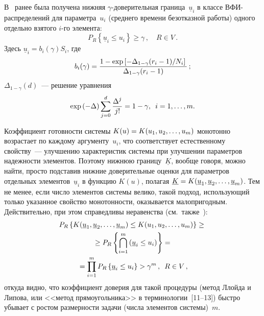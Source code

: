 \begin{multicols}{2}
     В~\cite{9-pav, 10-pav} ранее была получена нижняя 
     $\gamma$-до\-ве\-ри\-тель\-ная граница~$\underline{u}_i$ в классе 
ВФИ-рас\-пре\-де\-ле\-ний для параметра~$u_i$ (среднего времени 
безотказной работы) одного отдельно взятого $i$-го элемента:
     \begin{equation}
     P_R\left\{ \underline{u}_i\leq u_i\right\} \geq \gamma\,,\quad R\in V\,.
     \label{e2-pav}
     \end{equation}
Здесь $\underline{u}_i = b_i(\gamma)S_i$, где 
$$
b_i(\gamma)= \displaystyle\frac{\displaystyle  1-\exp \left[ -
\Delta_{1-\gamma}(r_i-1)/N_i\right]\mathstrut}{\displaystyle \Delta_{1-\gamma}(r_i-1)\mathstrut}\,;
$$ 
$\Delta_{1-\gamma}(d)$~--- решение уравнения 
$$
\exp \left( - \Delta\right)\sum\limits_{j=0}^d \fr{\Delta^j}{j!}=1-\gamma,\enskip 
i\hm=1,\ldots , m. $$

Коэффициент готовности системы $K(u)\hm= K(u_1, u_2,\ldots ,u_m)$ 
монотонно возрастает по каж\-до\-му аргументу~$u_i$, что соответствует 
естественному свойству~--- улучшению характеристик системы при 
улучшении параметров надежности элементов. Поэтому нижнюю 
границу~$\underline{K}$, вообще говоря, можно найти, просто подставив 
нижние доверительные оценки для параметров отдельных 
элементов~$\underline{u}_i$ в функцию $K(u)$, полагая $\underline{K}\hm= 
K(\underline{u}_1, \underline{u}_2,\ldots , \underline{u}_m)$. Тем не менее, 
если число элементов системы велико, такой подход, использующий только 
указанное свойство монотонности, оказывается малопригодным. 
Действительно, при этом справедливы неравенства (см.\ 
также~\cite{11-pav, 12-pav}):
\begin{multline*}
P_R\left\{ K(\underline{u}_1, \underline{u}_2, \ldots , \underline{u}_m) \leq 
K(u_1, u_2, \ldots , u_m)\right\} \geq{}\\
{}\geq P_R\left\{ \mathop{\bigcap}\limits_{i=1}^m 
\left( \underline{u}_i\leq u_i\right)\right\}={}\\
{}=\prod\limits_{i=1}^m P_R\left\{ \underline{u}_i\leq u_i\right\} > \gamma^m\,, 
\enskip R\in V\,,
\end{multline*}
откуда видно, что коэффициент доверия для такой процедуры (метод Ллойда 
и Липова, или <<метод прямоугольника>> в терминологии~[11--13]) быстро 
убывает с ростом размерности задачи (числа элементов системы)~$m$.


\end{multicols}
